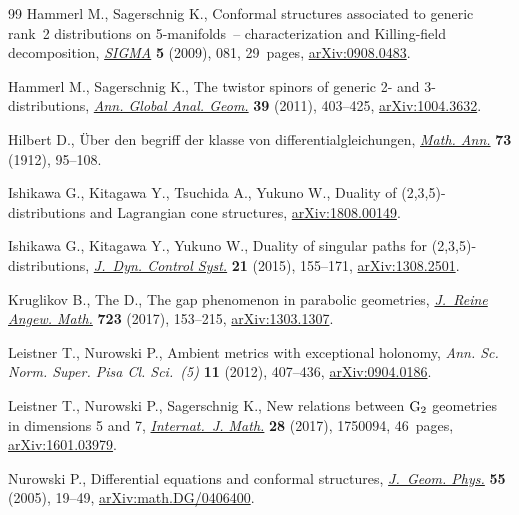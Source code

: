 \begin{thebibliography}{99}
Hammerl M., Sagerschnig K., Conformal structures associated to generic rank~2
 distributions on 5-manifolds~-- characterization and {K}illing-field
 decomposition, \href{https://doi.org/10.3842/SIGMA.2009.081}{\textit{SIGMA}} \textbf{5} (2009), 081, 29~pages,
 \href{https://arxiv.org/abs/0908.0483}{arXiv:0908.0483}.

Hammerl M., Sagerschnig K., The twistor spinors of generic 2- and
 3-distributions, \href{https://doi.org/10.1007/s10455-010-9240-2}{\textit{Ann. Global Anal. Geom.}} \textbf{39} (2011),
 403--425, \href{https://arxiv.org/abs/1004.3632}{arXiv:1004.3632}.

Hilbert D., \"{U}ber den begriff der klasse von differentialgleichungen,
 \href{https://doi.org/10.1007/BF01456663}{\textit{Math. Ann.}} \textbf{73} (1912), 95--108.

Ishikawa G., Kitagawa Y., Tsuchida A., Yukuno W., Duality of
 (2,3,5)-distributions and {L}agrangian cone structures, \href{https://arxiv.org/abs/1808.00149}{arXiv:1808.00149}.

Ishikawa G., Kitagawa Y., Yukuno W., Duality of singular paths for
 (2,3,5)-distributions, \href{https://doi.org/10.1007/s10883-014-9216-9}{\textit{J.~Dyn. Control Syst.}} \textbf{21} (2015),
 155--171, \href{https://arxiv.org/abs/1308.2501}{arXiv:1308.2501}.

Kruglikov B., The D., The gap phenomenon in parabolic geometries,
 \href{https://doi.org/10.1515/crelle-2014-0072}{\textit{J.~Reine Angew. Math.}} \textbf{723} (2017), 153--215,
 \href{https://arxiv.org/abs/1303.1307}{arXiv:1303.1307}.

Leistner T., Nurowski P., Ambient metrics with exceptional holonomy,
 \textit{Ann. Sc. Norm. Super. Pisa Cl. Sci.~(5)} \textbf{11} (2012),
 407--436, \href{https://arxiv.org/abs/0904.0186}{arXiv:0904.0186}.

Leistner T., Nurowski P., Sagerschnig K., New relations between {${\rm G}_2$}
 geometries in dimensions 5 and 7, \href{https://doi.org/10.1142/S0129167X1750094X}{\textit{Internat.~J. Math.}} \textbf{28}
 (2017), 1750094, 46~pages, \href{https://arxiv.org/abs/1601.03979}{arXiv:1601.03979}.

Nurowski P., Differential equations and conformal structures, \href{https://doi.org/10.1016/j.geomphys.2004.11.006}{\textit{J.~Geom.
 Phys.}} \textbf{55} (2005), 19--49, \href{https://arxiv.org/abs/math.DG/0406400}{arXiv:math.DG/0406400}.


\end{thebibliography}
